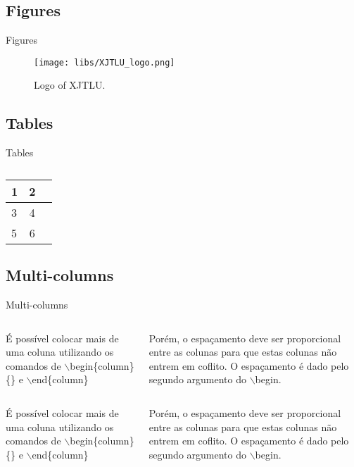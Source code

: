 \documentclass{libs/XJTLU_format}
\begin{document}
\subsection{Figures}
\begin{frame}{Figures}
    \begin{figure}
        \centering
        \texttt{[image: libs/XJTLU\_logo.png]}
        \caption{Logo of XJTLU.}
        \label{fig:XJTLU_logo}
    \end{figure}
\end{frame}

\subsection{Tables}
\begin{frame}{Tables}
\begin{table}[hbt]
  \begin{tabular}{l|cc}
    1& 2& \\
    \hline
    3& 4& \\
    5& 6&
  \end{tabular}
  \caption{}
\end{table}

\end{frame}

\subsection{Multi-columns}
\begin{frame}{Multi-columns}
    \begin{columns}{}
        \begin{column}{0.5\textwidth}
            \justify
            É possível colocar mais de uma coluna utilizando os comandos de $\backslash$begin\{column\}\{\} e $\backslash$end\{column\}
        \end{column}
        \begin{column}{0.5\textwidth}
            \justify
            Porém, o espaçamento deve ser proporcional entre as colunas para que estas colunas não entrem em coflito. O espaçamento é dado pelo segundo argumento do $\backslash$begin.
        \end{column}
    \end{columns}   
    \begin{columns}{}
        \begin{column}{0.5\textwidth}
            \justify
            É possível colocar mais de uma coluna utilizando os comandos de $\backslash$begin\{column\}\{\} e $\backslash$end\{column\}
        \end{column}
        \begin{column}{0.5\textwidth}
            \justify
            Porém, o espaçamento deve ser proporcional entre as colunas para que estas colunas não entrem em coflito. O espaçamento é dado pelo segundo argumento do $\backslash$begin.
        \end{column}
    \end{columns}     
\end{frame}
\end{document}
